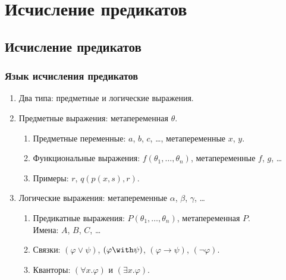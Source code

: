 \documentclass[10pt,a4paper,oneside]{article}
\begin{document}
\section{Исчисление предикатов}
\subsection{Исчисление предикатов}
\subsubsection{Язык исчисления предикатов}
\begin{enumerate}
\item Два типа: предметные и логические выражения.
\item Предметные выражения: метапеременная {\color{blue}$\theta$}.
\begin{enumerate}
\item Предметные переменные: {\color{blue}$a$}, {\color{blue}$b$}, {\color{blue}$c$}, \dots, метапеременные {\color{blue}$x$}, {\color{blue}$y$}.
\item Функциональные выражения: {\color{blue}$f(\theta_1,\dots,\theta_n)$}, метапеременные {\color{blue}$f$}, {\color{blue}$g$}, \dots\\
\item Примеры: %
  {\color{blue}$r$},
  {\color{blue}$q(p(x,s),r)$}.
\end{enumerate}
\item Логические выражения: метапеременные {\color{blue}$\alpha$}, {\color{blue}$\beta$}, {\color{blue}$\gamma$}, \dots
\begin{enumerate}
\item Предикатные выражения: {\color{blue}$P(\theta_1,\dots,\theta_n)$}, метапеременная {\color{blue}$P$}.\\
Имена: {\color{blue}$A$}, {\color{blue}$B$}, {\color{blue}$C$}, \dots  %
\item Связки: {\color{blue}$(\varphi\vee\psi)$}, {\color{blue}$(\varphi\with\psi)$}, {\color{blue}$(\varphi\rightarrow\psi)$}, 
   {\color{blue}$(\neg\varphi)$}.
\item Кванторы: {\color{blue}$(\forall x.\varphi)$} и {\color{blue}$(\exists x.\varphi)$}.
\end{enumerate}
\end{enumerate}
\end{document}
